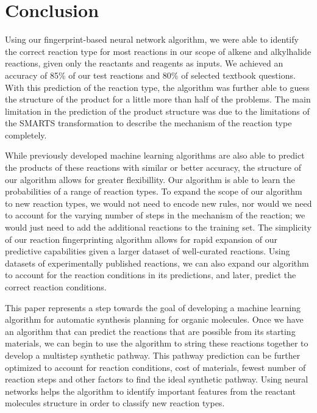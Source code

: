 \section{Conclusion}

Using our fingerprint-based neural network algorithm, we were able to identify the correct reaction type for most reactions in our scope of alkene and alkylhalide reactions, given only the reactants and reagents as inputs. We achieved an accuracy of 85\% of our test reactions and 80\% of selected textbook questions. With this prediction of the reaction type, the algorithm was further able to guess the structure of the product for a little more than half of the problems. The main limitation in the prediction of the product structure was due to the limitations of the SMARTS transformation to describe the mechanism of the reaction type completely.

While previously developed machine learning algorithms are also able to predict the products of these reactions with similar or better accuracy\cite{Kayala_2012}, the structure of our algorithm allows for greater flexibillity. Our algorithm is able to learn the probabilities of a range of reaction types. To expand the scope of our algorithm to new reaction types, we would not need to encode new rules, nor would we need to account for the varying number of steps in the mechanism of the reaction; we would just need to add the additional reactions to the training set. The simplicity of our reaction fingerprinting algorithm allows for rapid expansion of our predictive capabilities given a larger dataset of well-curated reactions\cite{Szymkuc_2016,ChemPlanner}. Using datasets of experimentally published reactions, we can also expand our algorithm to account for the reaction conditions in its predictions, and later, predict the correct reaction conditions.

This paper represents a step towards the goal of developing a machine learning algorithm for automatic synthesis planning for organic molecules. Once we have an algorithm that can predict the reactions that are possible from its starting materials, we can begin to use the algorithm to string these reactions together to develop a multistep synthetic pathway. This pathway prediction can be further optimized to account for reaction conditions, cost of materials, fewest number of reaction steps and other factors to find the ideal synthetic pathway. Using neural networks helps the algorithm to identify important features from the reactant molecules structure in order to classify new reaction types.


